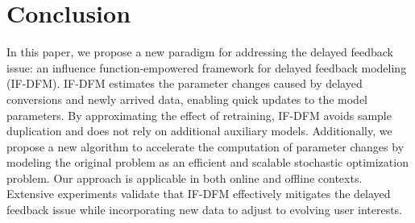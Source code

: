 \section{Conclusion}
In this paper, we propose a new paradigm for addressing the delayed feedback issue: an influence function-empowered framework for delayed feedback modeling (IF-DFM). IF-DFM estimates the parameter changes caused by delayed conversions and newly arrived data, enabling quick updates to the model parameters. By approximating the effect of retraining, IF-DFM avoids sample duplication and does not rely on additional auxiliary models. Additionally, we propose a new algorithm to accelerate the computation of parameter changes by modeling the original problem as an efficient and scalable stochastic optimization problem. Our approach is applicable in both online and offline contexts. Extensive experiments validate that IF-DFM effectively mitigates the delayed feedback issue while incorporating new data to adjust to evolving user interests. 
